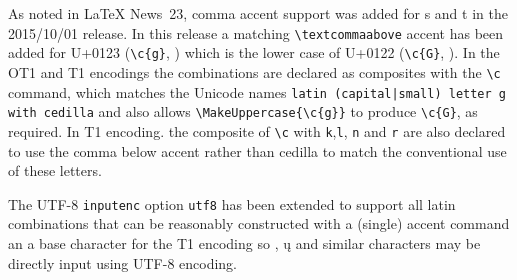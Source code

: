 \documentclass{ltnews}
\begin{document}
As noted in \LaTeX{} News~23, comma accent support was added for s and
t in the 2015/10/01 release. In this release a matching
\verb|\textcommaabove| accent has been added for U+0123 (\verb|\c{g}|,
) which is the lower case of U+0122 (\verb|\c{G}|,
).  In the OT1 and T1 encodings the combinations are
declared as composites with the \verb|\c| command, which matches the
Unicode names \texttt{latin (capital|small) letter g with cedilla} and
also allows \verb|\MakeUppercase{\c{g}}| to produce \verb|\c{G}|, as
required.  In T1 encoding. the composite of \verb|\c| with \texttt{k},\texttt{l},
\texttt{n} and \texttt{r} are also
declared to use the comma below accent rather than cedilla to match the
conventional use of these letters.

The UTF-8 \texttt{inputenc} option \texttt{utf8} has been extended to
support all latin combinations that can be reasonably constructed with a
(single) accent command an a base character for the T1 encoding so
, \k{u} and similar characters may be directly input
using UTF-8 encoding.
\end{document}
